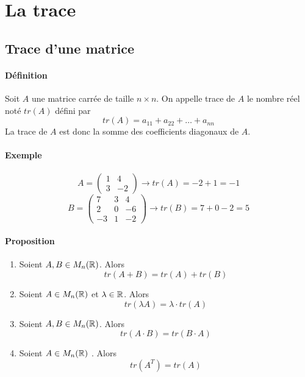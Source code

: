 
%
%
\section{La trace}
%
%
%
\subsection{Trace d'une matrice}
%
\paragraph{Définition} Soit $A$ une matrice carrée de taille $n\times n$. On appelle trace de $A$ le nombre réel noté $tr(A)$ défini par
$$tr(A) = a_{11} + a_{22} + \ldots + a_{nn}$$
La trace de $A$ est donc la somme des coefficients diagonaux de $A$.

\paragraph{Exemple} 
$$A = \begin{pmatrix} 1 & 4 \\ 3 & -2 \end{pmatrix} \rightarrow tr(A) = -2 + 1 = -1$$
$$B = \begin{pmatrix} 7 & 3 & 4 \\ 2 & 0 & -6 \\ -3 & 1 & -2 \end{pmatrix} \rightarrow tr(B) = 7 + 0 - 2 = 5$$

\paragraph{Proposition}
\begin{enumerate}[1)]
  \item Soient $A, B \in M_{n}(\mathbb{R})$. Alors
    $$tr(A + B) = tr(A) + tr(B)$$
  \item Soient $A \in M_{n}(\mathbb{R})$ et $\lambda \in \mathbb{R}$. Alors
    $$tr(\lambda A) = \lambda \cdot tr(A)$$
  \item Soient $A, B \in M_{n}(\mathbb{R})$. Alors
    $$tr(A \cdot B) = tr(B \cdot A)$$
  \item Soient $A \in M_{n}(\mathbb{R})$ . Alors
    $$tr(A^{T}) = tr(A)$$
\end{enumerate}

